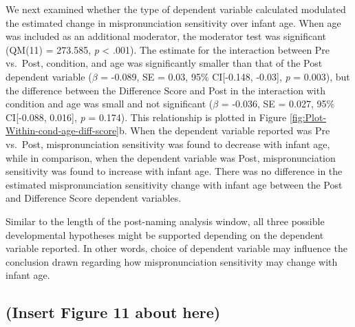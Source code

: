 \documentclass[man]{apa6}
\begin{document}
We next examined whether the type of dependent variable calculated modulated the estimated change in mispronunciation sensitivity over infant age. When age was included as an additional moderator, the moderator test was significant (QM(11) = 273.585, \emph{p} \textless{} .001). The estimate for the interaction between Pre vs.~Post, condition, and age was significantly smaller than that of the Post dependent variable (\(\beta\) = -0.089, SE = 0.03, 95\% CI{[}-0.148, -0.03{]}, \emph{p} = 0.003), but the difference between the Difference Score and Post in the interaction with condition and age was small and not significant (\(\beta\) = -0.036, SE = 0.027, 95\% CI{[}-0.088, 0.016{]}, \emph{p} = 0.174). This relationship is plotted in Figure \ref{fig:Plot-Within-cond-age-diff-score}b. When the dependent variable reported was Pre vs.~Post, mispronunciation sensitivity was found to decrease with infant age, while in comparison, when the dependent variable was Post, mispronunciation sensitivity was found to increase with infant age. There was no difference in the estimated mispronunciation sensitivity change with infant age between the Post and Difference Score dependent variables.

Similar to the length of the post-naming analysis window, all three possible developmental hypotheses might be supported depending on the dependent variable reported. In other words, choice of dependent variable may influence the conclusion drawn regarding how mispronunciation sensitivity may change with infant age.

\hypertarget{insert-figure-11-about-here}{%
\subsection{(Insert Figure 11 about here)}\label{insert-figure-11-about-here}}
\end{document}
